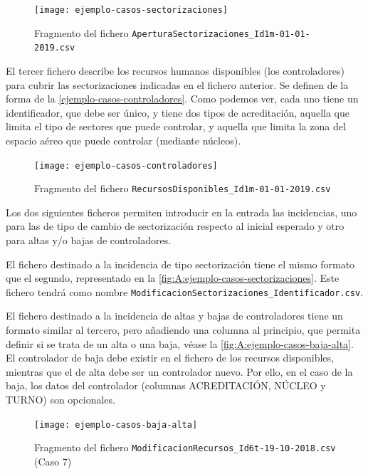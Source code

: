 \begin{figure}[h]
	\centering
	\texttt{[image: ejemplo-casos-sectorizaciones]}
	\caption{Fragmento del fichero \texttt{AperturaSectorizaciones\_Id1m-01-01-2019.csv}}
	\label{fig:A:ejemplo-casos-sectorizaciones}
\end{figure}

El tercer fichero describe los recursos humanos disponibles (los controladores) para cubrir las sectorizaciones indicadas en el fichero anterior. Se definen de la forma de la \autoref{ejemplo-casos-controladores}. Como podemos ver, cada uno tiene un identificador, que debe ser único, y tiene dos tipos de acreditación, aquella que limita el tipo de sectores que puede controlar, y aquella que limita la zona del espacio aéreo que puede controlar (mediante núcleos).

\begin{figure}[h]
	\centering
	\texttt{[image: ejemplo-casos-controladores]}
	\caption{Fragmento del fichero \texttt{RecursosDisponibles\_Id1m-01-01-2019.csv}}
	\label{fig:A:ejemplo-casos-controladores}
\end{figure}

Los dos siguientes ficheros permiten introducir en la entrada las incidencias, uno para las de tipo de cambio de sectorización respecto al inicial esperado y otro para altas y/o bajas de controladores.

El fichero destinado a la incidencia de tipo sectorización tiene el mismo formato que el segundo, representado en la \autoref{fig:A:ejemplo-casos-sectorizaciones}. Este fichero tendrá como nombre \texttt{ModificacionSectorizaciones\_Identificador.csv}.

El fichero destinado a la incidencia de altas y bajas de controladores tiene un formato similar al tercero, pero añadiendo una columna al principio, que permita definir si se trata de un alta o una baja, véase la \autoref{fig:A:ejemplo-casos-baja-alta}. El controlador de baja debe existir en el fichero de los recursos disponibles, mientras que el de alta debe ser un controlador nuevo. Por ello, en el caso de la baja, los datos del controlador (columnas ACREDITACIÓN, NÚCLEO y TURNO) son opcionales.

\begin{figure}[h]
	\centering
	\texttt{[image: ejemplo-casos-baja-alta]}
	\caption{Fragmento del fichero \texttt{ModificacionRecursos\_Id6t-19-10-2018.csv} (Caso 7)}
	\label{fig:A:ejemplo-casos-baja-alta}
\end{figure}

